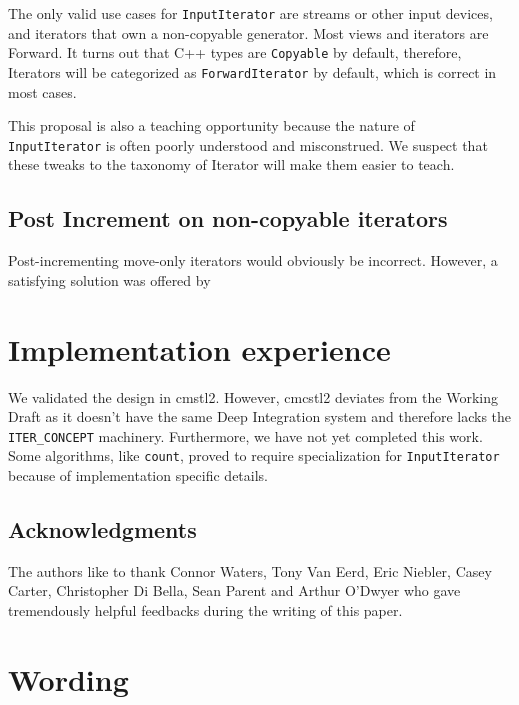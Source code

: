 \documentclass{wg21}
\begin{document}
The only valid use cases for \texttt{InputIterator} are streams or other
input devices, and iterators that own a non-copyable generator. Most
views and iterators are Forward. It turns out that C++ types are
\texttt{Copyable} by default, therefore, Iterators will be categorized
as \texttt{ForwardIterator} by default, which is correct in most cases.

This proposal is also a teaching opportunity because the nature of
\texttt{InputIterator} is often poorly understood and misconstrued. We
suspect that these tweaks to the taxonomy of Iterator will make them
easier to teach.

\hypertarget{post-increment-on-non-copyable-iterators}{%
	\subsection{Post Increment on non-copyable
		iterators}\label{post-increment-on-non-copyable-iterators}}

Post-incrementing move-only iterators would obviously be incorrect.
However, a satisfying solution was offered by \cite{P0541}


\hypertarget{implementation-experience}{%
	\section{Implementation experience}\label{implementation-experience}}

We validated the design in cmstl2. However, cmcstl2 deviates from the
Working Draft as it doesn't have the same Deep Integration system and
therefore lacks the \texttt{ITER\_CONCEPT} machinery. Furthermore, we
have not yet completed this work. Some algorithms, like \texttt{count},
proved to require specialization for \texttt{InputIterator} because of
implementation specific details.

\hypertarget{acknowledgments}{%
	\subsection{Acknowledgments}\label{acknowledgments}}

The authors like to thank Connor Waters, Tony Van Eerd, Eric Niebler,
Casey Carter, Christopher Di Bella, Sean Parent and Arthur O'Dwyer who
gave tremendously helpful feedbacks during the writing of this paper.


\section{Wording}
\end{document}
